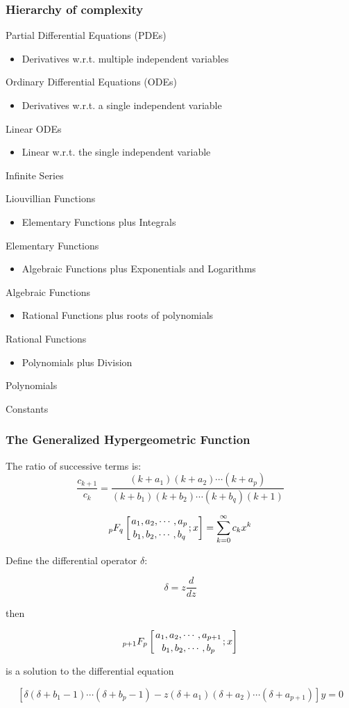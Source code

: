 \documentclass{beamer}
\begin{document}
\begin{frame}
\frametitle{Hierarchy of complexity}

Partial Differential Equations (PDEs)
\begin{itemize}
\item Derivatives w.r.t. multiple independent variables
\end{itemize}

Ordinary Differential Equations (ODEs)
\begin{itemize}
\item Derivatives w.r.t. a single independent variable
\end{itemize}

Linear ODEs
\begin{itemize}
\item Linear w.r.t. the single independent variable
\end{itemize}

Infinite Series

Liouvillian Functions
\begin{itemize}
\item Elementary Functions plus Integrals
\end{itemize}

Elementary Functions
\begin{itemize}
\item Algebraic Functions plus Exponentials and Logarithms
\end{itemize}

Algebraic Functions
\begin{itemize}
\item Rational Functions plus roots of polynomials
\end{itemize}

Rational Functions
\begin{itemize}
\item Polynomials plus Division
\end{itemize}

Polynomials

Constants
\end{frame}

\begin{frame}
\frametitle{The Generalized Hypergeometric Function}
The ratio of successive terms is:
\[ \frac{c_{k+1}}{c_k} = \frac{(k+a_1)(k+a_2)\cdots(k+a_p)}{(k+b_1)(k+b_2)\cdots(k+b_q)(k+1)} \]

\[ {}_p F_q\left[\genfrac{}{}{0pt}{0}{a_1,a_2,\cdots,a_p}{b_1,b_2,\cdots,b_q};x\right] = \sum_{k=0}^{\infty} c_k x^k \]

Define the differential operator $\delta$:

\[ \delta = z \frac{d}{dz} \]

then

\[ {}_{p+1} F_p\left[\genfrac{}{}{0pt}{0}{a_1,a_2,\cdots,a_{p+1}}{b_1,b_2,\cdots,b_p};x\right] \]

is a solution to the differential equation

\[ \left[ \delta(\delta + b_1 - 1)\cdots(\delta + b_p - 1) - z(\delta+a_1)(\delta+a_2)\cdots(\delta +a_{p+1}) \right] y = 0 \]
\end{frame}
\end{document}

